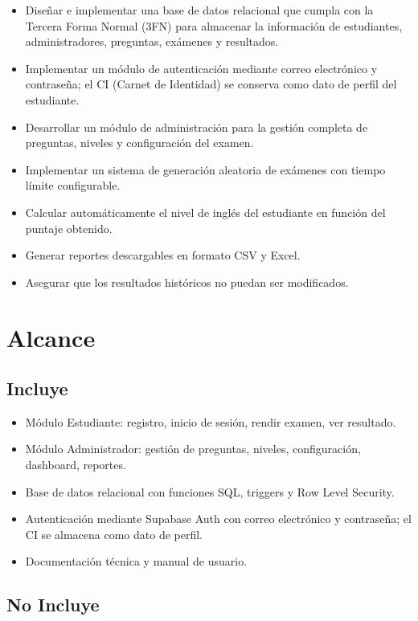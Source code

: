 \begin{itemize}
    \item Diseñar e implementar una base de datos relacional que cumpla con la Tercera Forma Normal (3FN) para almacenar la información de estudiantes, administradores, preguntas, exámenes y resultados.
    \item Implementar un módulo de autenticación mediante correo electrónico y contraseña; el CI (Carnet de Identidad) se conserva como dato de perfil del estudiante.
    \item Desarrollar un módulo de administración para la gestión completa de preguntas, niveles y configuración del examen.
    \item Implementar un sistema de generación aleatoria de exámenes con tiempo límite configurable.
    \item Calcular automáticamente el nivel de inglés del estudiante en función del puntaje obtenido.
    \item Generar reportes descargables en formato CSV y Excel.
    \item Asegurar que los resultados históricos no puedan ser modificados.
\end{itemize}

\section{Alcance}

\subsection{Incluye}

\begin{itemize}
    \item Módulo Estudiante: registro, inicio de sesión, rendir examen, ver resultado.
    \item Módulo Administrador: gestión de preguntas, niveles, configuración, dashboard, reportes.
    \item Base de datos relacional con funciones SQL, triggers y Row Level Security.
    \item Autenticación mediante Supabase Auth con correo electrónico y contraseña; el CI se almacena como dato de perfil.
    \item Documentación técnica y manual de usuario.
\end{itemize}

\subsection{No Incluye}

